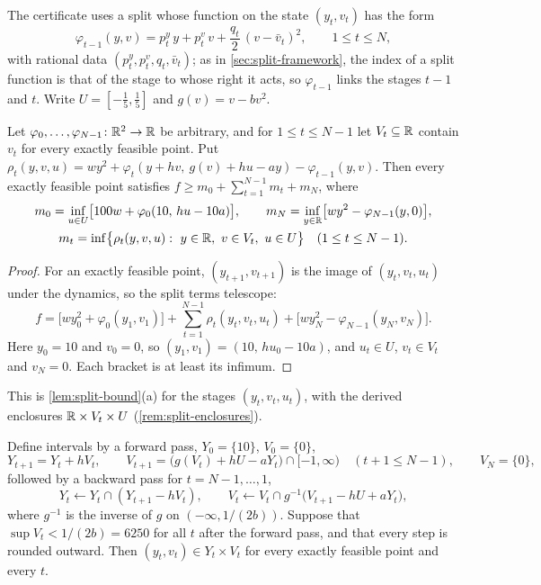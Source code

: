 The certificate uses a split whose function on the state $(y_t,v_t)$ has the form
\begin{equation}\label{eq:optcdeg2-S}
\varphi_{t-1}(y,v)=p^y_t\,y+p^v_t\,v+\frac{q_t}2\,(v-\bar v_t)^2,\qquad 1\le t\le N,
\end{equation}
with rational data $(p^y_t,p^v_t,q_t,\bar v_t)$; as in \cref{sec:split-framework}, the index of a split function is that of the stage to whose right it acts, so $\varphi_{t-1}$ links the stages $t-1$ and $t$.
Write $U=[-\tfrac15,\tfrac15]$ and $g(v)=v-bv^2$.

\begin{lemma}\label{lem:optcdeg2-krotov}
Let $\varphi_0,\dots,\varphi_{N-1}\colon\mathbb{R}^2\to\mathbb{R}$ be arbitrary, and for $1\le t\le N-1$ let $V_t\subseteq\mathbb{R}$ contain $v_t$ for every exactly feasible point.
Put $\rho_t(y,v,u)=wy^2+\varphi_t(y+hv,\ g(v)+hu-ay)-\varphi_{t-1}(y,v)$.
Then every exactly feasible point satisfies $f\ge m_0+\sum_{t=1}^{N-1}m_t+m_N$, where
\begin{gather*}
m_0=\inf_{u\in U}\bigl[100w+\varphi_0(10,\,hu-10a)\bigr],\qquad
m_N=\inf_{y\in\mathbb{R}}\bigl[wy^2-\varphi_{N-1}(y,0)\bigr],\\
m_t=\inf\bigl\{\rho_t(y,v,u):\ y\in\mathbb{R},\ v\in V_t,\ u\in U\bigr\}\quad(1\le t\le N-1).
\end{gather*}
\end{lemma}

\begin{proof}
For an exactly feasible point, $(y_{t+1},v_{t+1})$ is the image of $(y_t,v_t,u_t)$ under the dynamics, so the split terms telescope:
\[
f=\bigl[wy_0^2+\varphi_0(y_1,v_1)\bigr]+\sum_{t=1}^{N-1}\rho_t(y_t,v_t,u_t)+\bigl[wy_N^2-\varphi_{N-1}(y_N,v_N)\bigr].
\]
Here $y_0=10$ and $v_0=0$, so $(y_1,v_1)=(10,\,hu_0-10a)$, and $u_t\in U$, $v_t\in V_t$ and $v_N=0$.
Each bracket is at least its infimum.
\end{proof}

This is \cref{lem:split-bound}(a) for the stages $(y_t,v_t,u_t)$, with the derived enclosures $\mathbb{R}\times V_t\times U$ (\cref{rem:split-enclosures}).

\begin{lemma}\label{lem:optcdeg2-enclosure}
Define intervals by a forward pass, $Y_0=\{10\}$, $V_0=\{0\}$,
\[
Y_{t+1}=Y_t+hV_t,\qquad V_{t+1}=\bigl(g(V_t)+hU-aY_t\bigr)\cap[-1,\infty)\quad(t+1\le N-1),\qquad V_N=\{0\},
\]
followed by a backward pass for $t=N-1,\dots,1$,
\[
Y_t\leftarrow Y_t\cap(Y_{t+1}-hV_t),\qquad V_t\leftarrow V_t\cap g^{-1}\bigl(V_{t+1}-hU+aY_t\bigr),
\]
where $g^{-1}$ is the inverse of $g$ on $(-\infty,1/(2b))$.
Suppose that $\sup V_t<1/(2b)=6250$ for all $t$ after the forward pass, and that every step is rounded outward.
Then $(y_t,v_t)\in Y_t\times V_t$ for every exactly feasible point and every $t$.
\end{lemma}


